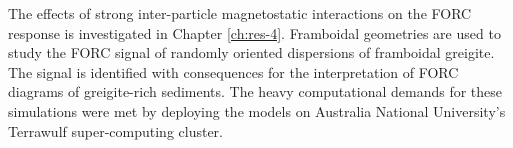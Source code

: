 The effects of strong inter-particle magnetostatic interactions on the FORC response is investigated in Chapter \ref{ch:res-4}. Framboidal geometries are used to study the FORC signal of randomly oriented dispersions of framboidal greigite. The signal is identified with consequences for the interpretation of FORC diagrams of greigite-rich sediments. The heavy computational demands for these simulations were met by deploying the models on Australia National University's Terrawulf super-computing cluster.\par

\renewcommand\bibname{{References}}



